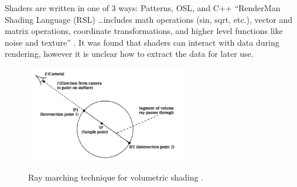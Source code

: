\documentclass[conference]{IEEEtran}
\begin{document}
Shaders are written in one of 3 ways: Patterns, OSL, and C++ \cite{shading}
``RenderMan Shading Language (RSL) \dots includes math operations (sin, sqrt, etc.),
vector and matrix operations, coordinate transformations, and higher level functions like noise and texture''
\cite{renderman_docs}.
It was found that shaders can interact with data during rendering,
however it is unclear how to extract the data for later use.

\begin{figure}[htbp]
\centering
{\includegraphics[width=7cm]{ray_marching.png}}
\caption{Ray marching technique for volumetric shading \cite{ray_marching}.}
\label{fig:ray_marching}
\end{figure}
\end{document}
